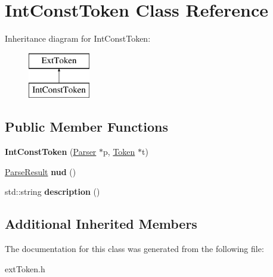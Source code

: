 \hypertarget{class_int_const_token}{}\section{Int\+Const\+Token Class Reference}
\label{class_int_const_token}
Inheritance diagram for Int\+Const\+Token\+:\begin{figure}[H]
\begin{center}
\leavevmode
\includegraphics[height=2.000000cm]{class_int_const_token}
\end{center}
\end{figure}
\subsection*{Public Member Functions}
\begin{DoxyCompactItemize}
\item 
\hypertarget{class_int_const_token_a14c6bf0af5a915969b4fef1758067af3}{}{\bfseries Int\+Const\+Token} (\hyperlink{class_parser}{Parser} $\ast$p, \hyperlink{class_token}{Token} $\ast$t)\label{class_int_const_token_a14c6bf0af5a915969b4fef1758067af3}

\item 
\hypertarget{class_int_const_token_ae1f720d6006c47e145cae7879d09c708}{}\hyperlink{class_parse_result}{Parse\+Result} {\bfseries nud} ()\label{class_int_const_token_ae1f720d6006c47e145cae7879d09c708}

\item 
\hypertarget{class_int_const_token_a98191508d849878d40800e447a0f1892}{}std\+::string {\bfseries description} ()\label{class_int_const_token_a98191508d849878d40800e447a0f1892}

\end{DoxyCompactItemize}
\subsection*{Additional Inherited Members}


The documentation for this class was generated from the following file\+:\begin{DoxyCompactItemize}
\item 
ext\+Token.\+h\end{DoxyCompactItemize}
